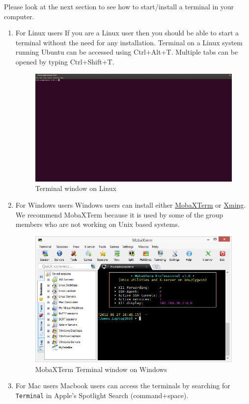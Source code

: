 \documentclass[11pt]{article}
\begin{document}
Please look at the next section to see how to start/install a terminal in your computer.
\begin{enumerate}
\item For Linux users
\label{sec:org0888aa8}
If you are a Linux user then you should be able to start a terminal without the need for any installation. Terminal on a Linux system running Ubuntu can be accessed using Ctrl+Alt+T. Multiple tabs can be opened by typing Ctrl+Shift+T.
\begin{figure}[htbp]
\centering
\includegraphics[width=.9\linewidth]{./figures/Ubuntu-terminal.png}
\caption{Terminal window on Linux}
\end{figure}

\item For Windows users
\label{sec:orgc0d2c73}
Windows users can install either \href{http://mobaxterm.mobatek.net/}{MobaXTerm} or \href{http://www.straightrunning.com/XmingNotes/}{Xming}. We recommend MobaXTerm because it is used by some of the group members who are not working on Unix based systems.
\begin{figure}[htbp]
\centering
\includegraphics[width=.9\linewidth]{./figures/moba.png}
\caption{MobaXTerm Terminal window on Windows}
\end{figure}

\item For Mac users
\label{sec:org115a258}
Macbook users can access the terminals by searching for \texttt{Terminal} in Apple's Spotlight Search (command+space).
\end{enumerate}
\end{document}
